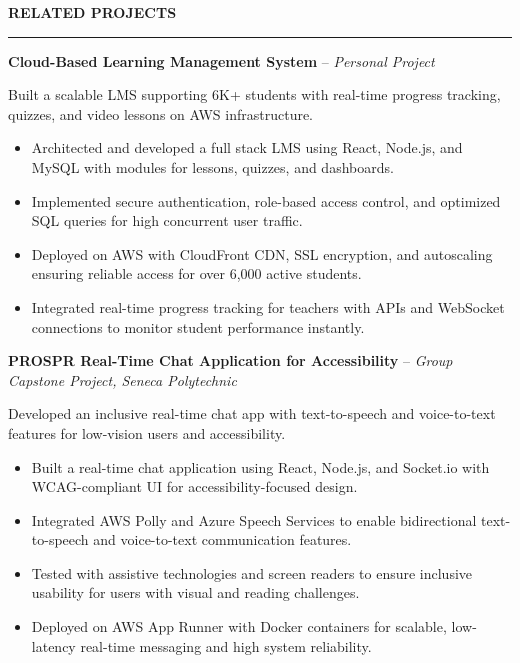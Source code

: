 \documentclass[10pt,letterpaper]{article}
\begin{document}
\vspace{6pt}

\textbf{RELATED PROJECTS}\\[-8pt]
\noindent\rule{\textwidth}{1pt}

\vspace{-2pt}

\textbf{Cloud-Based Learning Management System} -- \emph{Personal Project}

\vspace{-1pt}

Built a scalable LMS supporting 6K+ students with real-time progress tracking, quizzes, and video lessons on AWS infrastructure.
\vspace{-1pt}
\begin{itemize}
\item Architected and developed a full stack LMS using React, Node.js, and MySQL with modules for lessons, quizzes, and dashboards.
\item Implemented secure authentication, role-based access control, and optimized SQL queries for high concurrent user traffic.
\item Deployed on AWS with CloudFront CDN, SSL encryption, and autoscaling ensuring reliable access for over 6,000 active students.
\item Integrated real-time progress tracking for teachers with APIs and WebSocket connections to monitor student performance instantly.
\end{itemize}

\textbf{PROSPR  Real-Time Chat Application for Accessibility} -- \emph{Group Capstone Project, Seneca Polytechnic }

\vspace{-1pt}

Developed an inclusive real-time chat app with text-to-speech and voice-to-text features for low-vision users and accessibility.
\vspace{-1pt}
\begin{itemize}
\item Built a real-time chat application using React, Node.js, and Socket.io with WCAG-compliant UI for accessibility-focused design.
\item Integrated AWS Polly and Azure Speech Services to enable bidirectional text-to-speech and voice-to-text communication features.
\item Tested with assistive technologies and screen readers to ensure inclusive usability for users with visual and reading challenges.
\item Deployed on AWS App Runner with Docker containers for scalable, low-latency real-time messaging and high system reliability.
\end{itemize}
\end{document}

